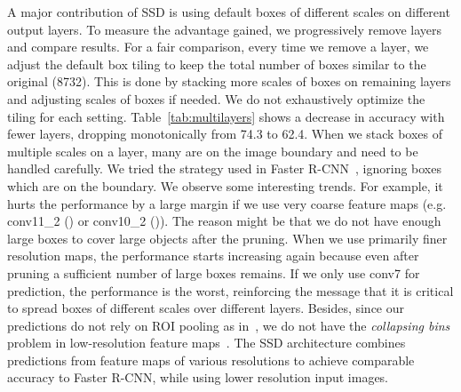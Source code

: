 \documentclass[runningheads]{llncs}
\begin{document}
 A major contribution of SSD is using default boxes of different scales on different output layers. To measure the advantage gained, we progressively remove layers and compare results. For a fair comparison, every time we remove a layer, we adjust the default box tiling to keep the total number of boxes similar to the original (8732).  This is done by stacking more scales of boxes on remaining layers and adjusting scales of boxes if needed. We do not exhaustively optimize the tiling for each setting. Table~\ref{tab:multilayers} shows a decrease in accuracy with fewer layers, dropping monotonically from 74.3 to 62.4.
When we stack boxes of multiple scales on a layer, many are on the image boundary and need to be handled carefully. We tried the strategy used in Faster R-CNN~\cite{ren2015faster}, ignoring boxes which are on the boundary. We observe some interesting trends. For example, it hurts the performance by a large margin if we use very coarse feature maps (e.g. conv11\_2 () or conv10\_2 ()). The reason might be that we do not have enough large boxes to cover large objects after the pruning. When we use primarily finer resolution maps, the performance starts increasing again because even after pruning a sufficient number of large boxes remains. If we only use conv7 for prediction, the performance is the worst, reinforcing the message that it is critical to spread boxes of different scales over different layers. Besides, since our predictions do not rely on ROI pooling as in~\cite{girshick2015fast}, we do not have the \emph{collapsing bins} problem in low-resolution feature maps~\cite{zhang2016is}.  The SSD architecture combines predictions from feature maps of various resolutions to achieve comparable accuracy to Faster R-CNN, while using lower resolution input images.
\end{document}
